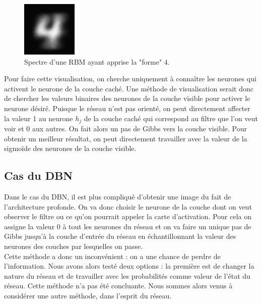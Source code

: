 \documentclass[a4paper,oneside]{report}
\begin{document}
\begin{figure}
                    \begin{center}
                        \includegraphics[width=75pt]{Images/spectres-01.png}
                    \end{center}
                    \caption{Spectre d'une RBM ayant apprise la "forme" 4.}
                \end{figure}

Pour faire cette visualisation, on cherche uniquement à connaître les neurones qui activent le neurone de la couche caché. 
Une méthode de visualisation serait donc de chercher les valeurs binaires  des neurones de la couche visible pour 
activer le neurone désiré. Puisque le réseau n'est pas orienté, on peut directement affecter la valeur 1 au neurone \textit{$h_{j}$} 
de la couche caché qui correspond au filtre que l'on veut voir et 0 aux autres. On fait alors un pas de Gibbs vers la couche visible. Pour obtenir un meilleur résultat, 
on peut directement travailler avec la valeur de la sigmoïde des neurones de la couche visible.

\subsection{Cas du DBN}

Dans le cas du DBN, il est plus compliqué d'obtenir une image du fait de l'architecture profonde. On va donc choisir le neurone de la couche dont  on veut observer le filtre ou ce qu'on pourrait appeler la carte d'activation. Pour cela on assigne la valeur 0 à tout les neurones du réseau et on va faire un unique pas de Gibbs jusqu'à la couche d'entrée du réseau en échantillonnant la valeur des neurones des couches par lesquelles on passe.\\

Cette méthode a donc un inconvénient : on a une chance de perdre de l'information. Nous avons alors testé deux options : la première est de changer la nature du réseau et de travailler avec les probabilités comme valeur de l'état du réseau. Cette méthode n'a pas été concluante. Nous sommes alors venus à considérer une autre méthode, dans l'esprit du réseau. \\
\end{document}

